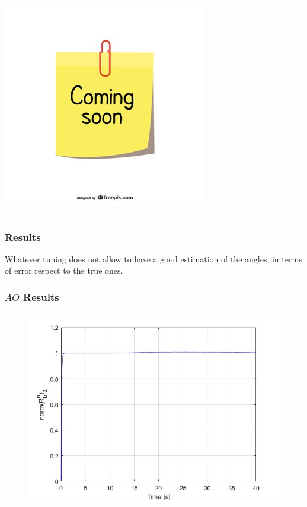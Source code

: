 \documentclass{beamer}
\begin{document}
\begin{frame}
\begin{columns}[t]
			\includegraphics[scale= 0.3]{coming-soon}
		\end{columns}
	\end{frame}

	\begin{frame}
		\frametitle{Results}
		Whatever tuning does not allow to have a good estimation of the angles, in terms of error respect to the true ones.
	\end{frame}

	\begin{frame}
		\frametitle{$AO$ Results}
		\begin{figure}[H]
			\includegraphics[scale=0.4]{norm_rot}
		\end{figure}
		
	\end{frame}
\end{document}
